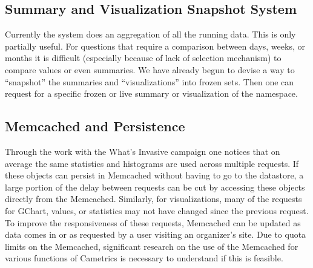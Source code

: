 \documentclass[10pt,a4paper,english]{article}
\begin{document}
\hypertarget{summary-and-visualization-snapshot-system}{}
\subsection*{Summary and Visualization Snapshot System}
\label{summary-and-visualization-snapshot-system}

Currently the system does an aggregation of all the running data. This is only partially useful. For questions that require a comparison between days, weeks, or months it is difficult (especially because of lack of selection mechanism) to compare values or even summaries. We have already begun to devise a way to ``snapshot'' the summaries and ``visualizations'' into frozen sets. Then one can request for a specific frozen or live summary or visualization of the namespace.



\hypertarget{memcached-and-persistence}{}
\subsection*{Memcached and Persistence}
\label{memcached-and-persistence}

Through the work with the What's Invasive campaign one notices that on average the same statistics and histograms are used across multiple requests. If these objects can persist in Memcached without having to go to the datastore, a large portion of the delay between requests can be cut by accessing these objects directly from the Memcached. Similarly, for visualizations, many of the requests for GChart, values, or statistics may not have changed since the previous request. To improve the responsiveness of these requests, Memcached can be updated as data comes in or as requested by a user visiting an organizer's site. Due to quota limits on the Memcached, significant research on the use of the Memcached for various functions of Cametrics is necessary to understand if this is feasible.
\end{document}
